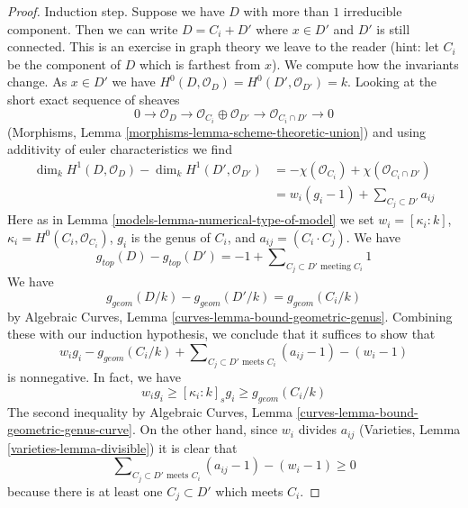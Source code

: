 \begin{proof}
\medskip\noindent
Induction step. Suppose we have $D$ with more than $1$ irreducible
component. Then we can write $D = C_i + D'$ where $x \in D'$ and
$D'$ is still connected. This is an exercise in graph theory we leave
to the reader (hint: let $C_i$ be the component of $D$ which is
farthest from $x$). We compute how the invariants change.
As $x \in D'$ we have $H^0(D, \mathcal{O}_D) = H^0(D', \mathcal{O}_{D'}) = k$.
Looking at the short exact sequence of sheaves
$$
0 \to \mathcal{O}_D \to \mathcal{O}_{C_i} \oplus \mathcal{O}_{D'}
\to \mathcal{O}_{C_i \cap D'} \to 0
$$
(Morphisms, Lemma \ref{morphisms-lemma-scheme-theoretic-union})
and using additivity of euler characteristics we find
\begin{align*}
\dim_k H^1(D, \mathcal{O}_D) - \dim_k H^1(D', \mathcal{O}_{D'})
& =
-\chi(\mathcal{O}_{C_i}) + \chi(\mathcal{O}_{C_i \cap D'}) \\
& =
w_i(g_i - 1) + \sum\nolimits_{C_j \subset D'} a_{ij}
\end{align*}
Here as in Lemma \ref{models-lemma-numerical-type-of-model} we set
$w_i = [\kappa_i : k]$, $\kappa_i = H^0(C_i, \mathcal{O}_{C_i})$,
$g_i$ is the genus of $C_i$, and $a_{ij} = (C_i \cdot C_j)$.
We have
$$
g_{top}(D) - g_{top}(D') = -1 +
\sum\nolimits_{C_j \subset D'\text{ meeting }C_i} 1
$$
We have
$$
g_{geom}(D/k) - g_{geom}(D'/k) = g_{geom}(C_i/k)
$$
by Algebraic Curves, Lemma \ref{curves-lemma-bound-geometric-genus}.
Combining these with our induction hypothesis, we
conclude that it suffices to show that
$$
w_i g_i - g_{geom}(C_i/k) +
\sum\nolimits_{C_j \subset D'\text{ meets } C_i} (a_{ij} - 1) - (w_i - 1)
$$
is nonnegative. In fact, we have
\begin{equation}
\label{equation-genus-change}
w_i g_i \geq [\kappa_i : k]_s g_i \geq g_{geom}(C_i/k)
\end{equation}
The second inequality by
Algebraic Curves, Lemma \ref{curves-lemma-bound-geometric-genus-curve}.
On the other hand, since $w_i$ divides $a_{ij}$
(Varieties, Lemma \ref{varieties-lemma-divisible})
it is clear that
\begin{equation}
\label{equation-change-intersections}
\sum\nolimits_{C_j \subset D'\text{ meets } C_i} (a_{ij} - 1) - (w_i - 1)
\geq 0
\end{equation}
because there is at least one $C_j \subset D'$ which meets $C_i$.
\end{proof}

